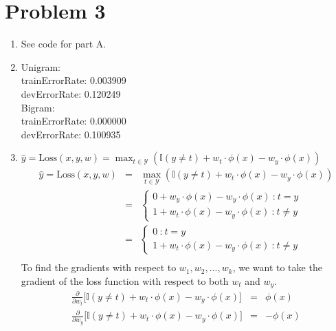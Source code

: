 \documentclass[12pt]{article}
\begin{document}
\section*{Problem 3}

\begin{enumerate}[label=(\alph*)]
  \item See code for part A.

  \item 
	Unigram:\\
	trainErrorRate: 0.003909\\
devErrorRate: 0.120249\\
  Bigram:\\
  trainErrorRate: 0.000000\\
devErrorRate: 0.100935\\
\item $\hat y = \mathrm{Loss}(x, y, w) = \max_{t \in \mathcal{Y}}( \mathbb{I}(y \neq t) + w_{t} \cdot \phi(x) - w_{y} \cdot \phi(x))$
\\
\begin{eqnarray*}
\hat y = \mathrm{Loss}(x, y, w) &=& \max_{t \in \mathcal{Y}}( \mathbb{I}(y \neq t) + w_{t} \cdot \phi(x) - w_{y} \cdot \phi(x))\\
&=& \left\{ \begin{matrix} 
	0 + w_y \cdot \phi(x) - w_y \cdot \phi(x) ~\textrm{:}~ t = y\\
	1 + w_t \cdot \phi(x) - w_y \cdot \phi(x) ~\textrm{:}~ t \ne y
	\end{matrix}\right.\\
&=& \left\{ \begin{matrix} 
0 ~\textrm{:}~ t = y\\
1 + w_t \cdot \phi(x) - w_y \cdot \phi(x) ~\textrm{:}~ t \ne y
\end{matrix}\right.\\
\end{eqnarray*}
To find the gradients with respect to $w_1, w_2, ..., w_k$, we want to take the gradient of the loss function with respect to both $w_t$ and $w_y$.
\begin{eqnarray*}
\frac{\partial}{\partial w_t} \biggl[\mathbb{I}(y \neq t) + w_{t} \cdot \phi(x) - w_{y} \cdot \phi(x) \biggr] &=& \phi(x)\\
\frac{\partial}{\partial w_y} \biggl[\mathbb{I}(y \neq t) + w_{t} \cdot \phi(x) - w_{y} \cdot \phi(x) \biggr] &=& -\phi(x)\\
\end{eqnarray*}


\end{enumerate}
\end{document}
